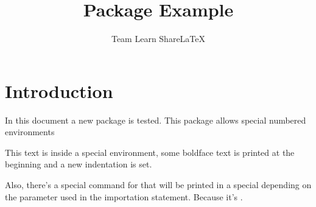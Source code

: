\documentclass{article}
\title{Package Example}
\author{Team Learn ShareLaTeX}
\date{ }
\begin{document}
 
\maketitle
 
\section{Introduction}
In this document a new package is tested. This package allows special numbered
environments
 
\begin{example}
This text is inside a special environment, some boldface text is printed
at the beginning and a new indentation is set.
\end{example}
 
Also, there's a special command for  that will be
printed in a special  depending on the parameter used in the
 importation statement. Because it's .
 
\printindex
 
\end{document}
